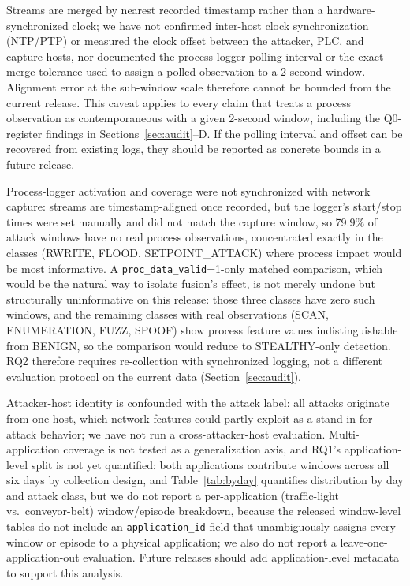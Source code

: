 \documentclass[conference]{IEEEtran}
\begin{document}
Streams are merged by nearest recorded timestamp rather than a hardware-synchronized clock; we have not
confirmed inter-host clock synchronization (NTP/PTP) or measured the clock offset between the attacker,
PLC, and capture hosts, nor documented the process-logger polling interval or the exact merge tolerance
used to assign a polled observation to a 2-second window. Alignment error at the sub-window scale
therefore cannot be bounded from the current release. This caveat applies to every claim that treats a
process observation as contemporaneous with a given 2-second window, including the Q0-register findings
in Sections~\ref{sec:audit}--D. If the polling interval and offset can be recovered from existing logs,
they should be reported as concrete bounds in a future release.

Process-logger activation and coverage were not synchronized with network capture: streams are
timestamp-aligned once recorded, but the logger's start/stop times were set manually and did not match
the capture window, so 79.9\% of attack windows have no real process observations, concentrated exactly
in the classes (RWRITE, FLOOD, SETPOINT\_ATTACK) where process impact would be most informative. A
\texttt{proc\_data\_valid}=1-only matched comparison, which would be the natural way to isolate fusion's
effect, is not merely undone but structurally uninformative on this release: those three classes have
zero such windows, and the remaining classes with real observations (SCAN, ENUMERATION, FUZZ, SPOOF) show
process feature values indistinguishable from BENIGN, so the comparison would reduce to STEALTHY-only
detection. RQ2 therefore requires re-collection with synchronized logging, not a different evaluation
protocol on the current data (Section~\ref{sec:audit}).

Attacker-host identity is confounded with the attack label: all attacks originate from one host, which
network features could partly exploit as a stand-in for attack behavior; we have not run a
cross-attacker-host evaluation. Multi-application coverage is not tested as a generalization axis, and
RQ1's application-level split is not yet quantified: both applications contribute windows across all six
days by collection design, and Table~\ref{tab:byday} quantifies distribution by day and attack class, but
we do not report a per-application (traffic-light vs.\ conveyor-belt) window/episode breakdown, because
the released window-level tables do not include an \texttt{application\_id} field that unambiguously
assigns every window or episode to a physical application; we also do not report a
leave-one-application-out evaluation. Future releases should add application-level metadata to support
this analysis.
\end{document}
